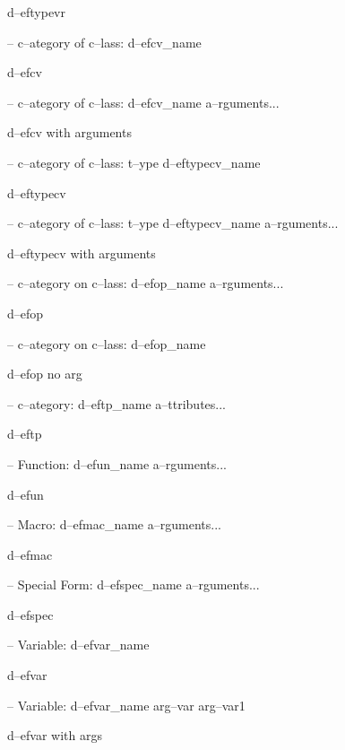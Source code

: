 \documentclass{book}
\begin{document}
%
d--eftypevr

\hbox{}-- c--ategory of c--lass: d--efcv\_name


%
d--efcv

\hbox{}-- c--ategory of c--lass: d--efcv\_name a--rguments...


%
d--efcv with arguments

\hbox{}-- c--ategory of c--lass: t--ype d--eftypecv\_name


%
d--eftypecv

\hbox{}-- c--ategory of c--lass: t--ype d--eftypecv\_name a--rguments...


%
d--eftypecv with arguments

\hbox{}-- c--ategory on c--lass: d--efop\_name a--rguments...


%
d--efop

\hbox{}-- c--ategory on c--lass: d--efop\_name


%
d--efop no arg

\hbox{}-- c--ategory: d--eftp\_name a--ttributes...


%
d--eftp

\hbox{}-- Function: d--efun\_name a--rguments...


%
d--efun

\hbox{}-- Macro: d--efmac\_name a--rguments...


%
d--efmac

\hbox{}-- Special Form: d--efspec\_name a--rguments...


%
d--efspec

\hbox{}-- Variable: d--efvar\_name


%
d--efvar

\hbox{}-- Variable: d--efvar\_name arg--var arg--var1


%
d--efvar with args
\end{document}
